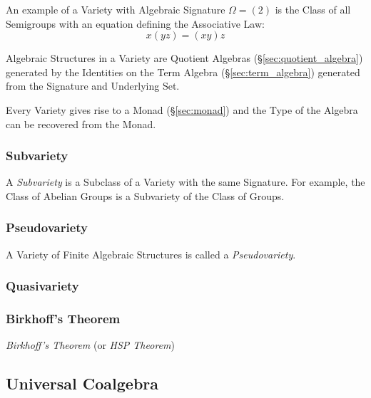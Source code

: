An example of a Variety with Algebraic Signature $\Omega = (2)$ is the
Class of all Semigroups with an equation defining the Associative Law:
\[
    x(yz) = (xy)z
\]

Algebraic Structures in a Variety are Quotient Algebras
(\S\ref{sec:quotient_algebra}) generated by the Identities on the Term
Algebra (\S\ref{sec:term_algebra}) generated from the Signature and
Underlying Set.

Every Variety gives rise to a Monad (\S\ref{sec:monad}) and the Type
of the Algebra can be recovered from the Monad.



\subsubsection{Subvariety}\label{sec:subvariety_theorem}

A \emph{Subvariety} is a Subclass of a Variety with the same
Signature. For example, the Class of Abelian Groups is a Subvariety of
the Class of Groups.



\subsubsection{Pseudovariety}\label{sec:pseudovariety}

A Variety of Finite Algebraic Structures is called a
\emph{Pseudovariety}.



\subsubsection{Quasivariety}\label{sec:quasivariety}



\subsubsection{Birkhoff's Theorem}\label{sec:birkhoffs_theorem}
\cite{birkhoff35}

\emph{Birkhoff's Theorem} (or \emph{HSP Theorem})



\subsection{Universal Coalgebra}\label{sec:universal_coalgebra}

